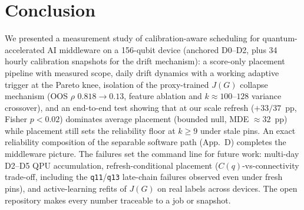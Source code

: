 \documentclass[journal,10pt,twocolumn]{IEEEtran}
\newcommand{\q}[1]{\texttt{q#1}}
\begin{document}
\section{Conclusion}
We presented a measurement study of calibration-aware scheduling for quantum-accelerated AI middleware on
a 156-qubit device (anchored D0--D2, plus 34 hourly calibration snapshots for the drift mechanism): a
score-only placement pipeline with measured scope, daily drift dynamics with a working adaptive trigger at the
Pareto knee, isolation of the proxy-trained $J(G)$ collapse mechanism (OOS $\rho$ $0.818{\to}0.13$, feature
ablation and $k\approx100$--$128$ variance crossover), and an end-to-end test showing that at our scale
refresh ($+33/37$~pp, Fisher $p{<}0.02$) dominates average placement (bounded null, MDE $\approx32$~pp) while
placement still sets the reliability floor at $k\ge9$ under stale pins. An exact reliability composition of the
separable software path (App.~D) completes the middleware picture. The failures set the command line for future
work: multi-day D2--D5 QPU accumulation, refresh-conditional placement ($C(q)$-vs-connectivity trade-off,
including the \q{11}/\q{13} late-chain failures observed even under fresh pins), and active-learning refits of
$J(G)$ on real labels across devices. The open repository makes every number traceable to a job or snapshot.
\end{document}
